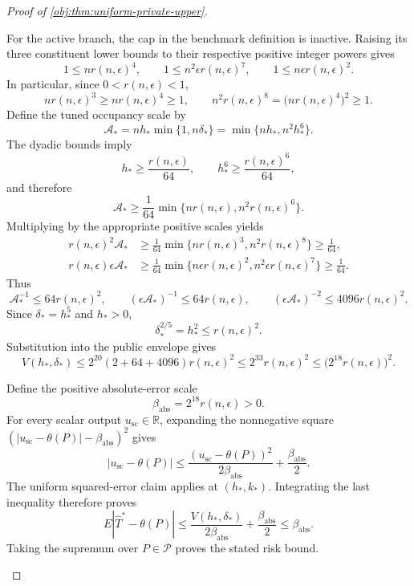 \documentclass[11pt]{article}
\begin{document}
\begin{proof}[Proof of \cref{obj:thm:uniform-private-upper}]
\begin{enumerate}
For the active branch, the cap in the benchmark definition is inactive. Raising its three constituent lower bounds to their respective positive integer powers gives
\[
1\le nr(n,\epsilon)^4,
\qquad
1\le n^2\epsilon r(n,\epsilon)^7,
\qquad
1\le n\epsilon r(n,\epsilon)^2.
\]
In particular, since \(0<r(n,\epsilon)<1\),
\[
nr(n,\epsilon)^3\ge nr(n,\epsilon)^4\ge1,
\qquad
n^2r(n,\epsilon)^8
=\bigl(nr(n,\epsilon)^4\bigr)^2\ge1.
\]
Define the tuned occupancy scale by
\[
\mathcal A_*
=nh_*\min\{1,n\delta_*\}
=\min\{nh_*,n^2h_*^6\}.
\]
The dyadic bounds imply
\[
h_*\ge\frac{r(n,\epsilon)}{64},
\qquad
h_*^6\ge\frac{r(n,\epsilon)^6}{64},
\]
and therefore
\[
\mathcal A_*
\ge
\frac1{64}
\min\{nr(n,\epsilon),n^2r(n,\epsilon)^6\}.
\]
Multiplying by the appropriate positive scales yields
\[
\begin{aligned}
r(n,\epsilon)^2\mathcal A_*
&\ge
\frac1{64}
\min\{nr(n,\epsilon)^3,n^2r(n,\epsilon)^8\}
\ge\frac1{64},\\
r(n,\epsilon)\epsilon\mathcal A_*
&\ge
\frac1{64}
\min\{n\epsilon r(n,\epsilon)^2,
      n^2\epsilon r(n,\epsilon)^7\}
\ge\frac1{64}.
\end{aligned}
\]
Thus
\[
\mathcal A_*^{-1}\le64r(n,\epsilon)^2,
\qquad
(\epsilon\mathcal A_*)^{-1}\le64r(n,\epsilon),
\qquad
(\epsilon\mathcal A_*)^{-2}\le4096r(n,\epsilon)^2.
\]
Since \(\delta_*=h_*^5\) and \(h_*>0\),
\[
\delta_*^{2/5}=h_*^2\le r(n,\epsilon)^2.
\]
Substitution into the public envelope gives
\[
V(h_*,\delta_*)
\le
2^{20}(2+64+4096)r(n,\epsilon)^2
\le2^{33}r(n,\epsilon)^2
\le\bigl(2^{18}r(n,\epsilon)\bigr)^2.
\]

Define the positive absolute-error scale
\[
\beta_{\mathrm{abs}}=2^{18}r(n,\epsilon)>0.
\]
For every scalar output \(u_{\mathrm{sc}}\in\mathbb R\), expanding the nonnegative square
\((|u_{\mathrm{sc}}-\theta(P)|-\beta_{\mathrm{abs}})^2\) gives
\[
|u_{\mathrm{sc}}-\theta(P)|
\le
\frac{(u_{\mathrm{sc}}-\theta(P))^2}{2\beta_{\mathrm{abs}}}
+\frac{\beta_{\mathrm{abs}}}{2}.
\]
The uniform squared-error claim applies at \((h_*,k_*)\). Integrating the last inequality therefore proves
\[
E|\widehat T^*-\theta(P)|
\le
\frac{V(h_*,\delta_*)}{2\beta_{\mathrm{abs}}}
+\frac{\beta_{\mathrm{abs}}}{2}
\le\beta_{\mathrm{abs}}.
\]
Taking the supremum over \(P\in\mathcal P\) proves the stated risk bound.


\end{enumerate}
\end{proof}
\end{document}
